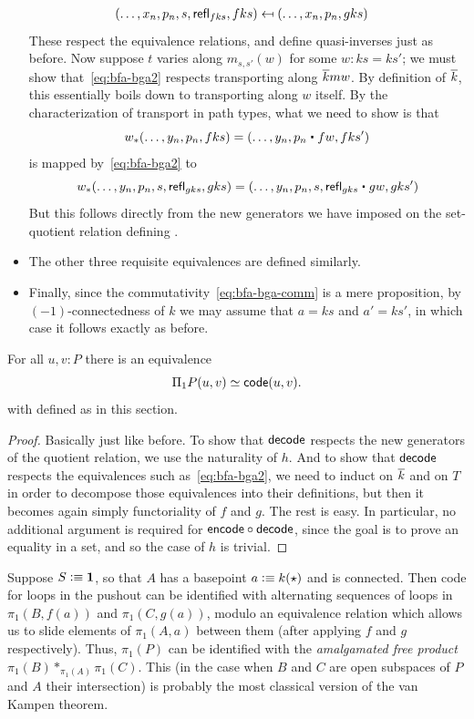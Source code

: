 \begin{itemize}
\begin{align*}
    (\dots, x_n, p_n, s, \mathsf{refl}_{fks}, fks) &\mapsfrom (\dots, x_n, p_n, gks)
  \end{align*}
  These respect the equivalence relations, and define quasi-inverses just as before.
  Now suppose $t$ varies along $m_{s,s'}(w)$ for some $w:ks=ks'$; we must show that~\eqref{eq:bfa-bga2} respects transporting along $\overline{k} mw$.
  By definition of $\overline{k}$, this essentially boils down to transporting along $w$ itself.
  By the characterization of transport in path types, what we need to show is that
  \[ w_*(\dots, y_n, p_n,fks) = (\dots,y_n, p_n \ct fw, fks') \]
  is mapped by~\eqref{eq:bfa-bga2} to
  \[ w_*(\dots,y_n,p_n,s,\refl{gks},gks) = (\dots, y_n, p_n, s, \refl{gks} \ct gw, gks') \]
  But this follows directly from the new generators we have imposed on the set-quotient relation defining \code.
\item The other three requisite equivalences are defined similarly.
\item Finally, since the commutativity~\eqref{eq:bfa-bga-comm} is a mere proposition, by $(-1)$-connectedness of $k$ we may assume that $a=ks$ and $a'=ks'$, in which case it follows exactly as before.
\end{itemize}

\begin{thm}
  For all $u,v:P$ there is an equivalence
  \[ \Pi_1P(u,v) \simeq \mathsf{code}(u,v). \]
  with \code defined as in this section.
\end{thm}

\begin{proof}
  Basically just like before.
  To show that $\mathsf{decode}$ respects the new generators of the quotient relation, we use the naturality of $h$.
  And to show that $\mathsf{decode}$ respects the equivalences such as~\eqref{eq:bfa-bga2}, we need to induct on $\overline{k}$ and on $T$ in order to decompose those equivalences into their definitions, but then it becomes again simply functoriality of $f$ and $g$.
  The rest is easy.
  In particular, no additional argument is required for $\mathsf{encode}\circ\mathsf{decode}$, since the goal is to prove an equality in a set, and so the case of $h$ is trivial.
\end{proof}

\begin{eg}\label{eg:clvk}
  Suppose $S\vcentcolon\equiv \mathbf{1}$, so that $A$ has a basepoint $a \vcentcolon\equiv k(\star)$ and is connected.
  Then code for loops in the pushout can be identified with alternating sequences of loops in $\pi_1(B,f(a))$ and $\pi_1(C,g(a))$, modulo an equivalence relation which allows us to slide elements of $\pi_1(A,a)$ between them (after applying $f$ and $g$ respectively).
  Thus, $\pi_1(P)$ can be identified with the \emph{amalgamated free product} $\pi_1(B) *_{\pi_1(A)} \pi_1(C)$.
  This (in the case when $B$ and $C$ are open subspaces of $P$ and $A$ their intersection) is probably the most classical version of the van Kampen theorem.
\end{eg}

